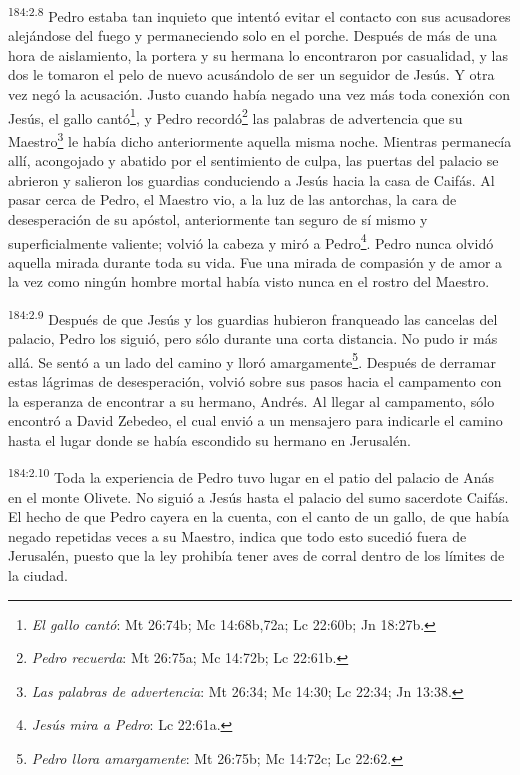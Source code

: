\par
\textsuperscript{184:2.8} Pedro estaba tan inquieto que intentó evitar el contacto con sus acusadores alejándose del fuego y permaneciendo solo en el porche. Después de más de una hora de aislamiento, la portera y su hermana lo encontraron por casualidad, y las dos le tomaron el pelo de nuevo acusándolo de ser un seguidor de Jesús. Y otra vez negó la acusación. Justo cuando había negado una vez más toda conexión con Jesús, el gallo cantó\footnote{\textit{El gallo cantó}: Mt 26:74b; Mc 14:68b,72a; Lc 22:60b; Jn 18:27b.}, y Pedro recordó\footnote{\textit{Pedro recuerda}: Mt 26:75a; Mc 14:72b; Lc 22:61b.} las palabras de advertencia que su Maestro\footnote{\textit{Las palabras de advertencia}: Mt 26:34; Mc 14:30; Lc 22:34; Jn 13:38.} le había dicho anteriormente aquella misma noche. Mientras permanecía allí, acongojado y abatido por el sentimiento de culpa, las puertas del palacio se abrieron y salieron los guardias conduciendo a Jesús hacia la casa de Caifás. Al pasar cerca de Pedro, el Maestro vio, a la luz de las antorchas, la cara de desesperación de su apóstol, anteriormente tan seguro de sí mismo y superficialmente valiente; volvió la cabeza y miró a Pedro\footnote{\textit{Jesús mira a Pedro}: Lc 22:61a.}. Pedro nunca olvidó aquella mirada durante toda su vida. Fue una mirada de compasión y de amor a la vez como ningún hombre mortal había visto nunca en el rostro del Maestro.

\par
\textsuperscript{184:2.9} Después de que Jesús y los guardias hubieron franqueado las cancelas del palacio, Pedro los siguió, pero sólo durante una corta distancia. No pudo ir más allá. Se sentó a un lado del camino y lloró amargamente\footnote{\textit{Pedro llora amargamente}: Mt 26:75b; Mc 14:72c; Lc 22:62.}. Después de derramar estas lágrimas de desesperación, volvió sobre sus pasos hacia el campamento con la esperanza de encontrar a su hermano, Andrés. Al llegar al campamento, sólo encontró a David Zebedeo, el cual envió a un mensajero para indicarle el camino hasta el lugar donde se había escondido su hermano en Jerusalén.

\par
\textsuperscript{184:2.10} Toda la experiencia de Pedro tuvo lugar en el patio del palacio de Anás en el monte Olivete. No siguió a Jesús hasta el palacio del sumo sacerdote Caifás. El hecho de que Pedro cayera en la cuenta, con el canto de un gallo, de que había negado repetidas veces a su Maestro, indica que todo esto sucedió fuera de Jerusalén, puesto que la ley prohibía tener aves de corral dentro de los límites de la ciudad.

